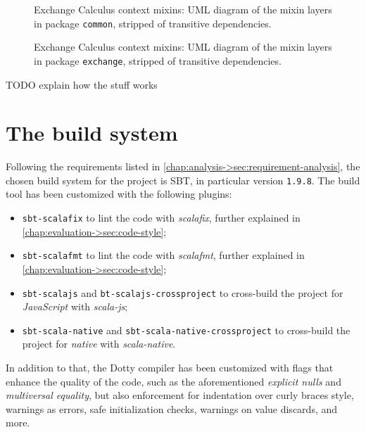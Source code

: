 \begin{figure}
    \centering
    \caption{Exchange Calculus context mixins: \ac{UML} diagram of the mixin layers in package \texttt{common}, stripped of transitive dependencies.}
    \label{fig:context-mixins-common}
    \bigskip
    \resizebox{\linewidth}{!}{
        
    }
\end{figure}

\begin{figure}
    \centering
    \caption{Exchange Calculus context mixins: \ac{UML} diagram of the mixin layers in package \texttt{exchange}, stripped of transitive dependencies.}
    \label{fig:context-mixins-exchange}
    \bigskip
    \resizebox{\linewidth}{!}{
        
    }
\end{figure}

TODO explain how the stuff works

\section{The build system}

Following the requirements listed in \cref{chap:analysis->sec:requirement-analysis}, the chosen build system for the project is \ac{SBT}, in particular version \texttt{1.9.8}.
%
The build tool has been customized with the following plugins:
\begin{itemize}
    \item \texttt{sbt-scalafix} to lint the code with \textit{scalafix}, further explained in \cref{chap:evaluation->sec:code-style};
    \item \texttt{sbt-scalafmt} to lint the code with \textit{scalafmt}, further explained in \cref{chap:evaluation->sec:code-style};
    \item \texttt{sbt-scalajs} and \texttt{bt-scalajs-crossproject} to cross-build the project for \textit{JavaScript} with \textit{scala-js};
    \item \texttt{sbt-scala-native} and \texttt{sbt-scala-native-crossproject} to cross-build the project for \textit{native} with \textit{scala-native}.
\end{itemize}
%
In addition to that, the Dotty compiler has been customized with flags that enhance the quality of the code, such as the aforementioned \textit{explicit nulls} and \textit{multiversal equality}, but also enforcement for indentation over curly braces style, warnings as errors, safe initialization checks, warnings on value discards, and more.

